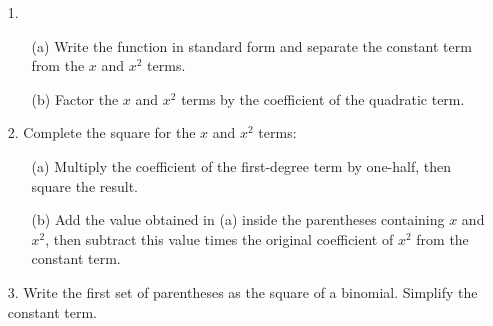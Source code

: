\documentclass{ximera}
\begin{document}
\begin{summary}
\begin{enumerate}
    \item[1.] \begin{enumerate}
        \item[(a)] Write the function in standard form and separate the constant term from the $x$ and $x^2$ terms.

        \item[(b)] Factor the $x$ and $x^2$ terms by the coefficient of the quadratic term.
    \end{enumerate}
    \item[2.] Complete the square for the $x$ and $x^2$ terms:
    \begin{enumerate}
        \item[(a)] Multiply the coefficient of the first-degree term by one-half, then square the result.
        \item[(b)] Add the value obtained in (a) inside the parentheses containing $x$ and $x^2$, then subtract this value times the original coefficient of $x^2$ from the constant term.
    \end{enumerate}
    \item[3.] Write the first set of parentheses as the square of a binomial. Simplify the constant term.
\end{enumerate}
\end{summary}
\end{document}
